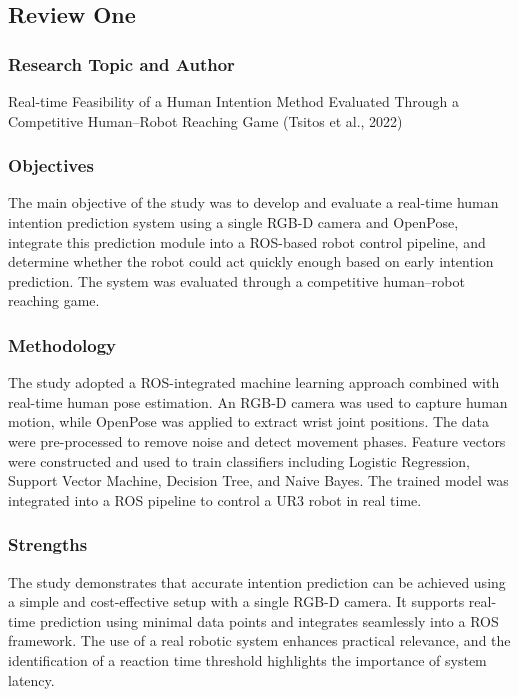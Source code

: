 \subsection{Review One}

\subsubsection{Research Topic and Author}

Real-time Feasibility of a Human Intention Method Evaluated Through a Competitive Human--Robot Reaching Game (Tsitos et al., 2022)

\subsubsection{Objectives}

The main objective of the study was to develop and evaluate a real-time human intention prediction system using a single RGB-D camera and OpenPose, integrate this prediction module into a ROS-based robot control pipeline, and determine whether the robot could act quickly enough based on early intention prediction. The system was evaluated through a competitive human--robot reaching game.

\subsubsection{Methodology}

The study adopted a ROS-integrated machine learning approach combined with real-time human pose estimation. An RGB-D camera was used to capture human motion, while OpenPose was applied to extract wrist joint positions. The data were pre-processed to remove noise and detect movement phases. Feature vectors were constructed and used to train classifiers including Logistic Regression, Support Vector Machine, Decision Tree, and Naive Bayes. The trained model was integrated into a ROS pipeline to control a UR3 robot in real time.

\subsubsection{Strengths}

The study demonstrates that accurate intention prediction can be achieved using a simple and cost-effective setup with a single RGB-D camera. It supports real-time prediction using minimal data points and integrates seamlessly into a ROS framework. The use of a real robotic system enhances practical relevance, and the identification of a reaction time threshold highlights the importance of system latency.

